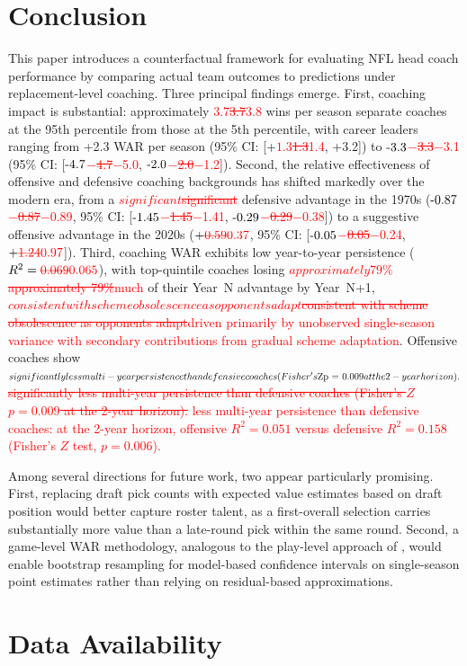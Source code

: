 \documentclass[USenglish]{article}
\newcommand{\rev}[1]{\textcolor{red}{#1}}
\newcommand{\del}[1]{\textcolor{red}{\ifmmode\mbox{\sout{\ensuremath{#1}}}\else\sout{#1}\fi}}
\theoremstyle{dgthm}
\theoremstyle{dgdef}
\begin{document}
\section{Conclusion}

This paper introduces a counterfactual framework for evaluating NFL head coach performance by comparing actual team outcomes to predictions under replacement-level coaching. Three principal findings emerge. First, coaching impact is substantial: approximately \del{3.7}\rev{3.8} wins per season separate coaches at the 95th percentile from those at the 5th percentile, with career leaders ranging from +2.3 WAR per season (95\% CI: [+\del{1.3}\rev{1.4}, +3.2]) to \del{$-$3.3}\rev{$-$3.1} (95\% CI: [\del{$-$4.7}\rev{$-$5.0}, \del{$-$2.0}\rev{$-$1.2}]). Second, the relative effectiveness of offensive and defensive coaching backgrounds has shifted markedly over the modern era, from a \del{significant }defensive advantage in the 1970s (\del{$-$0.87}\rev{$-$0.89}, 95\% CI: [\del{$-$1.45}\rev{$-$1.41}, \del{$-$0.29}\rev{$-$0.38}]) to a suggestive offensive advantage in the 2020s ($+\del{0.59}\rev{0.37}$, 95\% CI: [\del{$-$0.05}\rev{$-$0.24}, $+\del{1.24}\rev{0.97}$]). Third, coaching WAR exhibits low year-to-year persistence ($R^2 = \del{0.069}\rev{0.065}$), with top-quintile coaches losing \del{approximately 79\%}\rev{much} of their Year~N advantage by Year~N+1, \del{consistent with scheme obsolescence as opponents adapt}\rev{driven primarily by unobserved single-season variance with secondary contributions from gradual scheme adaptation}. Offensive coaches show \del{significantly less multi-year persistence than defensive coaches (Fisher's $Z$ $p = 0.009$ at the 2-year horizon).} \rev{less multi-year persistence than defensive coaches: at the 2-year horizon, offensive $R^2 = 0.051$ versus defensive $R^2 = 0.158$ (Fisher's $Z$ test, $p = 0.006$).}

Among several directions for future work, two appear particularly promising. First, replacing draft pick counts with expected value estimates based on draft position would better capture roster talent, as a first-overall selection carries substantially more value than a late-round pick within the same round. Second, a game-level WAR methodology, analogous to the play-level approach of \citet{yurko2019}, would enable bootstrap resampling for model-based confidence intervals on single-season point estimates rather than relying on residual-based approximations.

\section*{Data Availability}
\end{document}
